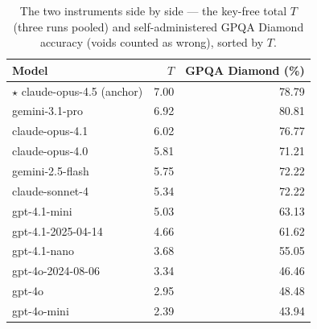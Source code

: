\documentclass{article}
\begin{document}
\begin{table}[H]
\caption{The two instruments side by side --- the key-free total \(T\) (three runs pooled) and self-administered GPQA Diamond accuracy (voids counted as wrong), sorted by \(T\).}
\label{tab-gpqa-values}
\begin{center}\small
\begin{tabular}{@{}lrr@{}}
\toprule\noalign{}
Model & \(T\) & GPQA Diamond (\%) \\
\midrule\noalign{}
\ensuremath{\star} claude-opus-4.5 (anchor) &\cellcolor[HTML]{2072B2}\textcolor[HTML]{FFFFFF}{7.00}&\cellcolor[HTML]{2351A2}\textcolor[HTML]{FFFFFF}{78.79} \\
gemini-3.1-pro &\cellcolor[HTML]{2076B3}\textcolor[HTML]{FFFFFF}{6.92}&\cellcolor[HTML]{234A9F}\textcolor[HTML]{FFFFFF}{80.81} \\
claude-opus-4.1 &\cellcolor[HTML]{2498C1}\textcolor[HTML]{FFFFFF}{6.02}&\cellcolor[HTML]{2258A5}\textcolor[HTML]{FFFFFF}{76.77} \\
claude-opus-4.0 &\cellcolor[HTML]{2A9EC1}\textcolor[HTML]{FFFFFF}{5.81}&\cellcolor[HTML]{206DAF}\textcolor[HTML]{FFFFFF}{71.21} \\
gemini-2.5-flash &\cellcolor[HTML]{2BA0C2}\textcolor[HTML]{FFFFFF}{5.75}&\cellcolor[HTML]{2169AD}\textcolor[HTML]{FFFFFF}{72.22} \\
claude-sonnet-4 &\cellcolor[HTML]{37ACC3}\textcolor[HTML]{FFFFFF}{5.34}&\cellcolor[HTML]{2169AD}\textcolor[HTML]{FFFFFF}{72.22} \\
gpt-4.1-mini &\cellcolor[HTML]{40B5C4}\textcolor[HTML]{000000}{5.03}&\cellcolor[HTML]{1D8EBF}\textcolor[HTML]{FFFFFF}{63.13} \\
gpt-4.1-2025-04-14 &\cellcolor[HTML]{52BCC2}\textcolor[HTML]{000000}{4.66}&\cellcolor[HTML]{2094C0}\textcolor[HTML]{FFFFFF}{61.62} \\
gpt-4.1-nano &\cellcolor[HTML]{83CFBB}\textcolor[HTML]{000000}{3.68}&\cellcolor[HTML]{32A7C2}\textcolor[HTML]{FFFFFF}{55.05} \\
gpt-4o-2024-08-06 &\cellcolor[HTML]{97D6B9}\textcolor[HTML]{000000}{3.34}&\cellcolor[HTML]{53BDC1}\textcolor[HTML]{000000}{46.46} \\
gpt-4o &\cellcolor[HTML]{ADDFB7}\textcolor[HTML]{000000}{2.95}&\cellcolor[HTML]{49B9C3}\textcolor[HTML]{000000}{48.48} \\
gpt-4o-mini &\cellcolor[HTML]{CAEAB4}\textcolor[HTML]{000000}{2.39}&\cellcolor[HTML]{5FC1C0}\textcolor[HTML]{000000}{43.94} \\
\bottomrule
\end{tabular}
\end{center}
\end{table}
\end{document}
